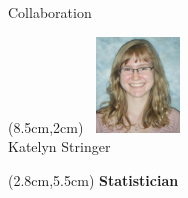 \documentclass[12pt]{beamer}
\newcommand{\w}{1in}
\newcommand{\h}{1in}
\begin{document}
\begin{frame}{Collaboration}
  \begin{textblock*}{3cm}(8.5cm,2cm) %
 $\, $\includegraphics[width=\w,height=\h]{figs/stringer.jpg}\\
Katelyn Stringer
\end{textblock*}

  \begin{textblock*}{3cm}(2.8cm,5.5cm) %
    \textbf{Statistician}
  \end{textblock*}


\end{frame}
\end{document}
